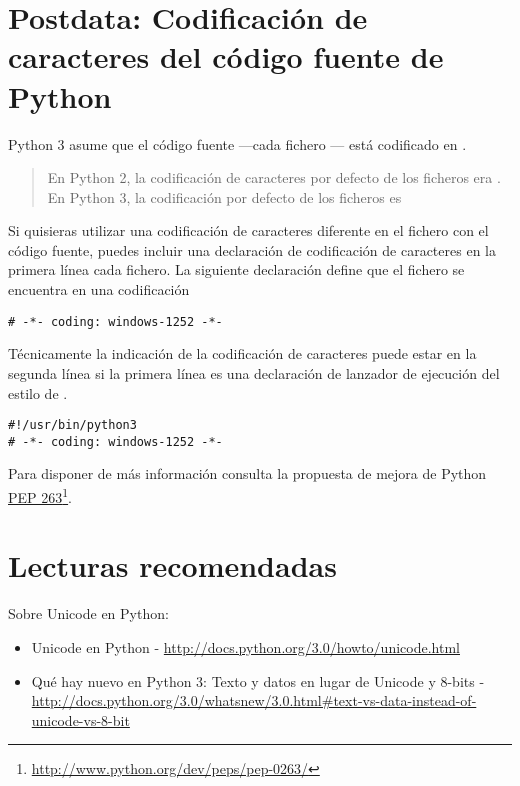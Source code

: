 \section{Postdata: Codificación de  caracteres del código fuente de Python}

Python 3 asume que el código fuente ---cada fichero --- está codificado en .

\begin{quote}
En Python 2, la codificación de caracteres por defecto de los ficheros  era . En Python 3, la codificación por defecto de los ficheros es 
\end{quote}

Si quisieras utilizar una codificación de caracteres diferente en el fichero con el código fuente, puedes incluir una declaración de codificación de caracteres en la primera línea cada fichero. La siguiente declaración define que el fichero se encuentra en una codificación 

\noindent\begin{minipage}{\textwidth}
\begin{lstlisting}[mathescape=True]
# -*- coding: windows-1252 -*-
\end{lstlisting}
\end{minipage}

Técnicamente la indicación de la codificación de caracteres puede estar en la segunda línea si la primera línea es una declaración de lanzador de ejecución del estilo de .

\noindent\begin{minipage}{\textwidth}
\begin{lstlisting}[mathescape=True]
#!/usr/bin/python3
# -*- coding: windows-1252 -*-
\end{lstlisting}
\end{minipage}

Para disponer de más información consulta la propuesta de mejora de Python \href{http://www.python.org/dev/peps/pep-0263/}{PEP 263}\footnote{\href{http://www.python.org/dev/peps/pep-0263/}{http://www.python.org/dev/peps/pep-0263/}}.

\section{Lecturas recomendadas}

Sobre Unicode en Python:


\begin{itemize}

\item Unicode en Python - \href{http://docs.python.org/3.0/howto/unicode.html}{http://docs.python.org/3.0/howto/unicode.html} 

\item Qué hay nuevo en Python 3: Texto y datos en lugar de Unicode y 8-bits - \href{http://docs.python.org/3.0/whatsnew/3.0.html\#text-vs-data-instead-of-unicode-vs-8-bit}{http://docs.python.org/3.0/whatsnew/3.0.html\#text-vs-data-instead-of-unicode-vs-8-bit}

\end{itemize}

